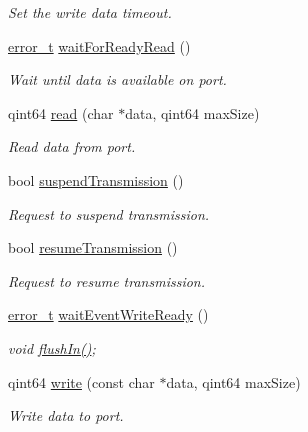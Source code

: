 \begin{DoxyCompactItemize}
\begin{DoxyCompactList}\small\item\em Set the write data timeout. \end{DoxyCompactList}\item 
\hyperlink{classmdt_abstract_port_ad4121bb930c95887e77f8bafa065a85e}{error\_\-t} \hyperlink{classmdt_serial_port_ad150a45c68d98a501bea2f102aeadb50}{waitForReadyRead} ()
\begin{DoxyCompactList}\small\item\em Wait until data is available on port. \end{DoxyCompactList}\item 
qint64 \hyperlink{classmdt_serial_port_a12274d7956b2af961ccdd36cfc2052cc}{read} (char $\ast$data, qint64 maxSize)
\begin{DoxyCompactList}\small\item\em Read data from port. \end{DoxyCompactList}\item 
bool \hyperlink{classmdt_serial_port_a9412faf413eca5ee3516139fdfaaf2fe}{suspendTransmission} ()
\begin{DoxyCompactList}\small\item\em Request to suspend transmission. \end{DoxyCompactList}\item 
bool \hyperlink{classmdt_serial_port_a02fd5ee74a7f52c3bce0545ec8a659bf}{resumeTransmission} ()
\begin{DoxyCompactList}\small\item\em Request to resume transmission. \end{DoxyCompactList}\item 
\hyperlink{classmdt_abstract_port_ad4121bb930c95887e77f8bafa065a85e}{error\_\-t} \hyperlink{classmdt_serial_port_a988825b3ff2ef93a1b43e2df316055bd}{waitEventWriteReady} ()
\begin{DoxyCompactList}\small\item\em void \hyperlink{classmdt_abstract_port_a32329b4188db796401e4f454755acb44}{flushIn()}; \end{DoxyCompactList}\item 
qint64 \hyperlink{classmdt_serial_port_a282f99035c032fbb6fa86ccd10deb597}{write} (const char $\ast$data, qint64 maxSize)
\begin{DoxyCompactList}\small\item\em Write data to port. \end{DoxyCompactList}\item 

\end{DoxyCompactItemize}
